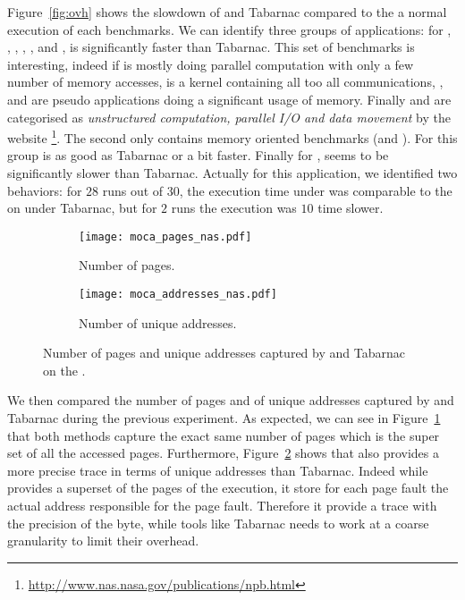 Figure~\ref{fig:ovh} shows the slowdown of \Moca and Tabarnac compared to the
a normal execution of each benchmarks. We can identify three groups of
applications:  for \BT, \DC, \EP, \LU, \FT, \SP and \UA, \Moca is
significantly faster than Tabarnac. This set of benchmarks is interesting,
indeed if \EP is mostly doing parallel computation with only a few number of
memory accesses, \FT is a kernel containing all too all communications, \BT,
\LU and \SP are pseudo applications doing a significant usage of memory.
Finally \DC and \UA are categorised as \emph{unstructured computation,
parallel I/O and data movement} by the \NPB website
\footnote{\url{http://www.nas.nasa.gov/publications/npb.html}}. The second only
contains memory oriented benchmarks (\CG and \IS). For this group \Moca is as
good as Tabarnac or a bit faster. Finally for \MG, \Moca seems to be
significantly slower than Tabarnac. Actually for this application, we
identified two behaviors: for $28$ runs out of $30$, the execution time under
\Moca was comparable to the on under Tabarnac, but for $2$ runs the execution
was $10$ time slower.

\begin{figure}[htb]
    \centering
    \begin{subfigure}{\linewidth}
        \texttt{[image: moca\_pages\_nas.pdf]}
        \caption{Number of pages.}
        \label{fig:pages}
    \end{subfigure}
    \begin{subfigure}{\linewidth}
        \texttt{[image: moca\_addresses\_nas.pdf]}
        \caption{Number of unique addresses.}
        \label{fig:addr}
    \end{subfigure}
    \caption{Number of pages and unique addresses captured by \Moca and Tabarnac
    on the \NPB.}
    \label{fig:pages-addr}
\end{figure}

We then compared the number of pages and of unique addresses captured by \Moca
and Tabarnac during the previous experiment. As expected, we can see in
Figure~\ref{fig:pages} that both methods capture the exact same number of
pages which is the super set of all the accessed pages. Furthermore,
Figure~\ref{fig:addr} shows that \Moca also provides a more precise trace in
terms of unique addresses than Tabarnac. Indeed while \Moca provides a
superset of the pages of the execution, it store for each page fault the
actual address responsible for the page fault. Therefore it provide a trace
with the precision of the byte, while tools like Tabarnac needs to work at a
coarse granularity to limit their overhead.

